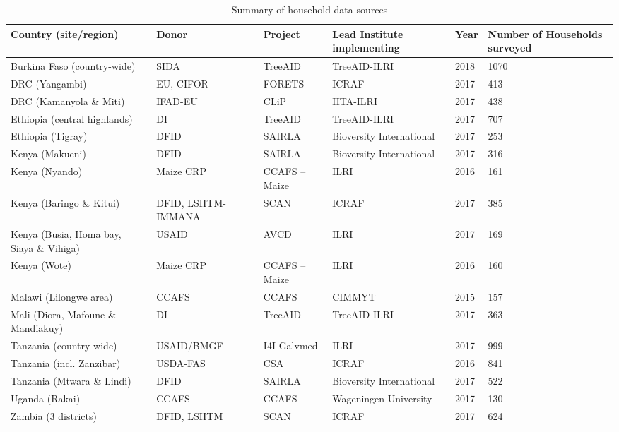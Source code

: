 \begin{table}
  \captionsetup{singlelinecheck = false, justification=justified}
  \caption{Summary of household data sources}
  \label{tab:C_2}
  \small
\begin{tabularx}{\textwidth}{
p{}
p{}
p{}
p{}
p{}
p{}}
\toprule
Country (site/region) & Donor & Project & Lead Institute implementing & Year & Number of Households surveyed \\
\midrule
Burkina Faso (country-wide) & SIDA & TreeAID & TreeAID-ILRI & 2018 & 1070 \\
DRC (Yangambi) & EU, CIFOR & FORETS & ICRAF & 2017 & 413 \\
DRC (Kamanyola \& Miti) & IFAD-EU & CLiP & IITA-ILRI & 2017 & 438 \\
Ethiopia (central highlands) & DI & TreeAID & TreeAID-ILRI & 2017 & 707 \\
Ethiopia (Tigray) & DFID & SAIRLA & Bioversity International & 2017 & 253 \\
Kenya (Makueni) & DFID & SAIRLA & Bioversity International & 2017 & 316 \\
Kenya (Nyando) & Maize CRP & CCAFS -- Maize & ILRI & 2016 & 161 \\
Kenya (Baringo \& Kitui) & DFID, LSHTM- IMMANA & SCAN & ICRAF & 2017 & 385 \\
Kenya (Busia, Homa bay, Siaya \& Vihiga) & USAID & AVCD & ILRI & 2017 & 169 \\
Kenya (Wote) & Maize CRP & CCAFS -- Maize & ILRI & 2016 & 160 \\
Malawi (Lilongwe area) & CCAFS & CCAFS & CIMMYT & 2015 & 157 \\
Mali (Diora, Mafoune \& Mandiakuy) & DI & TreeAID & TreeAID-ILRI & 2017 & 363 \\
Tanzania (country-wide) & USAID/BMGF & I4I Galvmed & ILRI & 2017 & 999 \\
Tanzania (incl. Zanzibar) & USDA-FAS & CSA & ICRAF & 2016 & 841 \\
Tanzania (Mtwara \& Lindi) & DFID & SAIRLA & Bioversity International & 2017 & 522 \\
Uganda (Rakai) & CCAFS & CCAFS & Wageningen University & 2017 & 130 \\
Zambia (3 districts) & DFID, LSHTM & SCAN & ICRAF & 2017 & 624 \\
\bottomrule
\end{tabularx}
\end{table}

